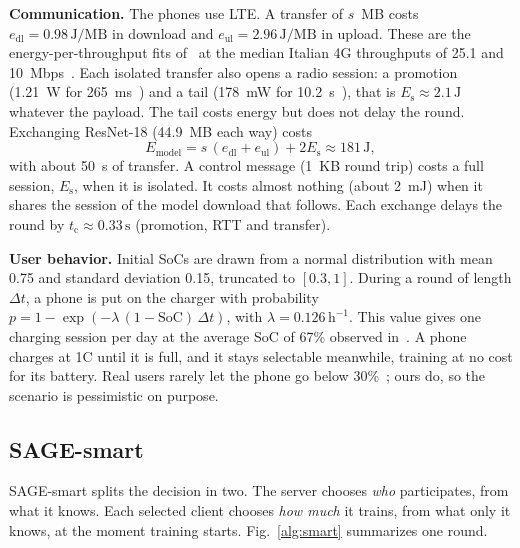 \textbf{Communication.}
The phones use LTE. A transfer of $s$~MB costs $e_{\mathrm{dl}}=0.98\,\mathrm{J/MB}$
in download and $e_{\mathrm{ul}}=2.96\,\mathrm{J/MB}$ in upload. These are the
energy-per-throughput fits of~\cite{narayanan2021variegated} at the median
Italian 4G throughputs of 25.1 and 10~Mbps~\cite{opensignal2018italy}.
Each isolated transfer also opens a radio session: a promotion
(1.21~W for 265~ms~\cite{huang2012lte,narayanan2021variegated})
and a tail (178~mW for 10.2~s~\cite{narayanan2021variegated}),
that is $E_{\mathrm{s}}\approx2.1\,\mathrm{J}$ whatever the payload. The tail costs
energy but does not delay the round. Exchanging ResNet-18 (44.9~MB each
way) costs
\begin{equation}
  E_{\mathrm{model}} = s\,(e_{\mathrm{dl}}+e_{\mathrm{ul}}) + 2E_{\mathrm{s}}
  \approx 181\,\mathrm{J},
  \label{eq:comm}
\end{equation}
with about 50~s of transfer. A control message (1~KB round
trip) costs a full session, $E_{\mathrm{s}}$, when it is isolated. It costs
almost nothing (about 2~mJ) when it shares the session of the model
download that follows. Each exchange delays the round by
$t_{\mathrm{c}}\approx0.33\,\mathrm{s}$ (promotion, RTT and transfer).

\textbf{User behavior.}
Initial SoCs are drawn from a normal distribution with mean 0.75 and standard
deviation 0.15, truncated to $[0.3,1]$. During a round of length $\Delta t$, a
phone is put on the charger with probability
$p = 1-\exp\!\left(-\lambda\,(1-\mathrm{SoC})\,\Delta t\right)$, with
$\lambda=0.126\,\mathrm{h}^{-1}$. This value gives one charging session per day at
the average SoC of 67\% observed in~\cite{ferreira2011battery}. A phone
charges at 1C until it is full, and it stays selectable meanwhile, training at
no cost for its battery. Real users rarely let the phone go below
30\%~\cite{ferreira2011battery}; ours do, so the scenario is pessimistic on
purpose.

\subsection{SAGE-smart}\label{sec:smart}

SAGE-smart splits the decision in two. The server chooses \emph{who}
participates, from what it knows. Each selected client chooses \emph{how
much} it trains, from what only it knows, at the moment training starts.
Fig.~\ref{alg:smart} summarizes one round.

